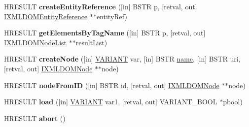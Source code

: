 \begin{DoxyCompactItemize}
H\+R\+E\+S\+U\+LT {\bfseries create\+Entity\+Reference} (\mbox{[}in\mbox{]} B\+S\+TR p, \mbox{[}retval, out\mbox{]} \hyperlink{interface_m_s_x_m_l2_1_1_i_x_m_l_d_o_m_entity_reference}{I\+X\+M\+L\+D\+O\+M\+Entity\+Reference} $\ast$$\ast$entity\+Ref)
\item 
\mbox{\label{interface_m_s_x_m_l2_1_1_i_x_m_l_d_o_m_document_a1b3f369dcb374a151da24e588a40b19c}} 
H\+R\+E\+S\+U\+LT {\bfseries get\+Elements\+By\+Tag\+Name} (\mbox{[}in\mbox{]} B\+S\+TR p, \mbox{[}retval, out\mbox{]} \hyperlink{interface_m_s_x_m_l2_1_1_i_x_m_l_d_o_m_node_list}{I\+X\+M\+L\+D\+O\+M\+Node\+List} $\ast$$\ast$result\+List)
\item 
\mbox{\label{interface_m_s_x_m_l2_1_1_i_x_m_l_d_o_m_document_a08a2554780432feb8bd6170fe0fe38a5}} 
H\+R\+E\+S\+U\+LT {\bfseries create\+Node} (\mbox{[}in\mbox{]} \hyperlink{structtag_v_a_r_i_a_n_t}{V\+A\+R\+I\+A\+NT} var, \mbox{[}in\mbox{]} B\+S\+TR \hyperlink{structname}{name}, \mbox{[}in\mbox{]} B\+S\+TR uri, \mbox{[}retval, out\mbox{]} \hyperlink{interface_m_s_x_m_l2_1_1_i_x_m_l_d_o_m_node}{I\+X\+M\+L\+D\+O\+M\+Node} $\ast$$\ast$node)
\item 
\mbox{\label{interface_m_s_x_m_l2_1_1_i_x_m_l_d_o_m_document_a751eab69e4b02f93e43f2bf797f15907}} 
H\+R\+E\+S\+U\+LT {\bfseries node\+From\+ID} (\mbox{[}in\mbox{]} B\+S\+TR id, \mbox{[}retval, out\mbox{]} \hyperlink{interface_m_s_x_m_l2_1_1_i_x_m_l_d_o_m_node}{I\+X\+M\+L\+D\+O\+M\+Node} $\ast$$\ast$node)
\item 
\mbox{\label{interface_m_s_x_m_l2_1_1_i_x_m_l_d_o_m_document_a44497bf88817e937ee1b0f14e62cec7a}} 
H\+R\+E\+S\+U\+LT {\bfseries load} (\mbox{[}in\mbox{]} \hyperlink{structtag_v_a_r_i_a_n_t}{V\+A\+R\+I\+A\+NT} var1, \mbox{[}retval, out\mbox{]} V\+A\+R\+I\+A\+N\+T\+\_\+\+B\+O\+OL $\ast$pbool)
\item 
\mbox{\label{interface_m_s_x_m_l2_1_1_i_x_m_l_d_o_m_document_a871c05778f6945b586d0aa25a103c2b5}} 
H\+R\+E\+S\+U\+LT {\bfseries abort} ()
\item 
\mbox{\label{interface_m_s_x_m_l2_1_1_i_x_m_l_d_o_m_document_aad034fc5a082971ba3453182f508fd54}} 

\end{DoxyCompactItemize}

